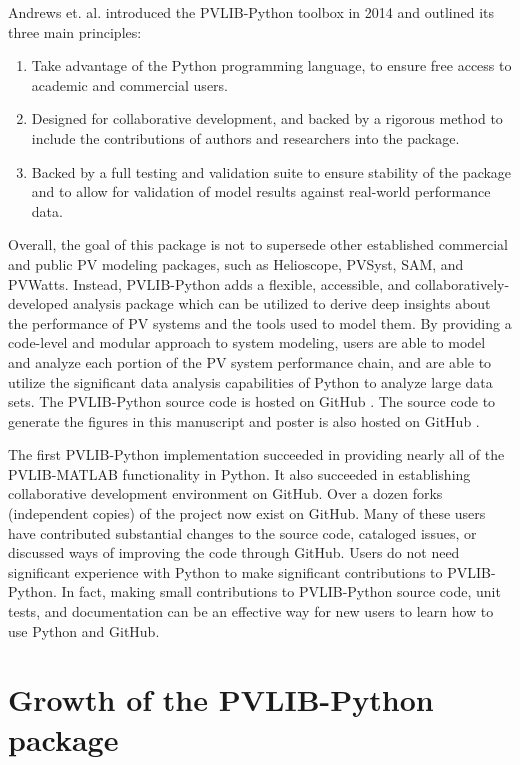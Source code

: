 \documentclass[conference]{IEEEtran}
\begin{document}
Andrews et. al. \cite{andrews} introduced the PVLIB-Python toolbox in 2014 and outlined its three main principles:

\begin{enumerate}
\item Take advantage of the Python programming language, to ensure free access to academic and commercial users.
\item Designed for collaborative development, and backed by a rigorous method to include the contributions of authors and researchers into the package.
\item Backed by a full testing and validation suite to ensure stability of the package and to allow for validation of model results against real-world performance data.
\end{enumerate}

Overall, the goal of this package is not to supersede other established commercial and public PV modeling packages, such as Helioscope, PVSyst, SAM, and PVWatts. 
Instead, PVLIB-Python adds a flexible, accessible, and collaboratively-developed analysis package which can be utilized to derive deep insights about the performance of PV systems and the tools used to model them.
By providing a code-level and modular approach to system modeling, users are able to model and analyze each portion of the PV system performance chain, and are able to utilize the significant data analysis capabilities of Python to analyze large data sets.
The PVLIB-Python source code is hosted on GitHub \cite{pvlib-github}.
The source code to generate the figures in this manuscript and poster is also hosted on GitHub \cite{pvlib-pvsc2015-github}.

The first PVLIB-Python implementation \cite{sandia-github} succeeded in providing nearly all of the PVLIB-MATLAB functionality in Python.
It also succeeded in establishing collaborative development environment on GitHub. 
Over a dozen forks (independent copies) of the project now exist on GitHub. 
Many of these users have contributed substantial changes to the source code, cataloged issues, or discussed ways of improving the code through GitHub.
Users do not need significant experience with Python to make significant contributions to PVLIB-Python.
In fact, making small contributions to PVLIB-Python source code, unit tests, and documentation can be an effective way for new users to learn how to use Python and GitHub.


\section{Growth of the PVLIB-Python package}
\end{document}

